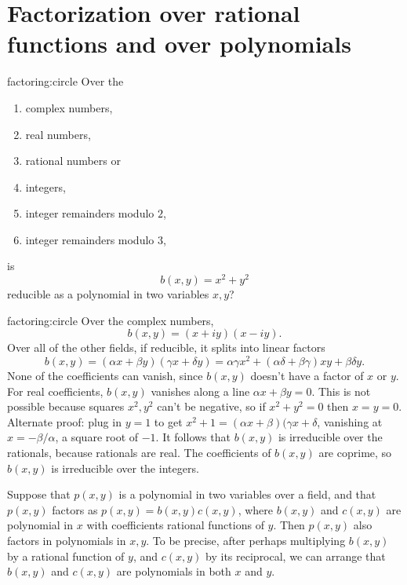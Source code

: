 \section{Factorization over rational functions and over polynomials}
\begin{problem}{factoring:circle}
Over the
\begin{enumerate}
\item
complex numbers,
\item
real numbers,
\item
rational numbers or
\item
integers,
\item
integer remainders modulo \(2\),
\item
integer remainders modulo \(3\),
\end{enumerate}
is
\[
b(x,y)=x^2+y^2
\]
reducible as a polynomial in two variables \(x,y\)?
\end{problem}
\begin{answer}{factoring:circle}
Over the complex numbers,
\[
b(x,y)=(x+iy)(x-iy).
\]
Over all of the other fields, if reducible, it splits into linear factors
\[
b(x,y)=(\alpha x+\beta y)(\gamma x+\delta y)=\alpha\gamma x^2 + (\alpha\delta+\beta\gamma)xy+\beta\delta y.
\]
None of the coefficients can vanish, since \(b(x,y)\) doesn't have a factor of \(x\) or \(y\).
For real coefficients, \(b(x,y)\) vanishes along a line \(\alpha x+\beta y=0\).
This is not possible because squares \(x^2,y^2\) can't be negative, so if \(x^2+y^2=0\) then \(x=y=0\).
Alternate proof: plug in \(y=1\) to get \(x^2+1=(\alpha x+\beta)(\gamma x+\delta\), vanishing at \(x=-\beta/\alpha\), a square root of \(-1\).
It follows that \(b(x,y)\) is irreducible over the rationals, because rationals are real.
The coefficients of \(b(x,y)\) are coprime, so \(b(x,y)\) is irreducible over the integers.
\end{answer}
\begin{proposition}\label{proposition:Gauss.lemma}
Suppose that \(p(x,y)\) is a polynomial in two variables over a field, and that \(p(x,y)\) factors as \(p(x,y)=b(x,y)c(x,y)\), where \(b(x,y)\) and \(c(x,y)\) are polynomial in \(x\) with coefficients rational functions of \(y\).
Then \(p(x,y)\) also factors in polynomials in \(x,y\).
To be precise, after perhaps multiplying \(b(x,y)\) by a rational function of \(y\), and \(c(x,y)\) by its reciprocal, we can arrange that \(b(x,y)\) and \(c(x,y)\) are polynomials in both \(x\) and \(y\).
\end{proposition}
